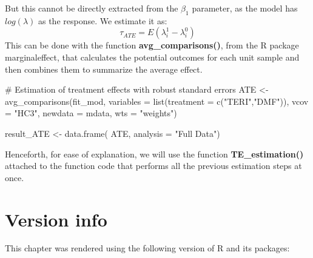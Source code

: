 \documentclass[
  letterpaper,
  DIV=11,
  numbers=noendperiod]{scrreprt}
\newenvironment{Shaded}{\begin{snugshade}}{\end{snugshade}}
\newcommand{\AttributeTok}[1]{\textcolor[rgb]{0.40,0.45,0.13}{#1}}
\newcommand{\CommentTok}[1]{\textcolor[rgb]{0.37,0.37,0.37}{#1}}
\newcommand{\FunctionTok}[1]{\textcolor[rgb]{0.28,0.35,0.67}{#1}}
\newcommand{\NormalTok}[1]{\textcolor[rgb]{0.00,0.23,0.31}{#1}}
\newcommand{\OtherTok}[1]{\textcolor[rgb]{0.00,0.23,0.31}{#1}}
\newcommand{\StringTok}[1]{\textcolor[rgb]{0.13,0.47,0.30}{#1}}
\begin{document}
But this cannot be directly extracted from the \(\beta_1\) parameter, as
the model has \(log(\lambda)\) as the response. We estimate it as:
\[\tau_{ATE}=E(\lambda^1_i-\lambda^0_i)\] This can be done with the
function \textbf{avg\_comparisons()}, from the R package marginaleffect,
that calculates the potential outcomes for each unit sample and then
combines them to summarize the average effect.

\begin{Shaded}
\begin{Highlighting}[]
\CommentTok{\# Estimation of treatment effects with robust standard errors}
\NormalTok{ATE }\OtherTok{\textless{}{-}} \FunctionTok{avg\_comparisons}\NormalTok{(fit\_mod, }
                       \AttributeTok{variables =} \FunctionTok{list}\NormalTok{(}\AttributeTok{treatment =} \FunctionTok{c}\NormalTok{(}\StringTok{"TERI"}\NormalTok{,}\StringTok{"DMF"}\NormalTok{)),}
                       \AttributeTok{vcov =} \StringTok{"HC3"}\NormalTok{,}
                       \AttributeTok{newdata =}\NormalTok{ mdata,}
                       \AttributeTok{wts =} \StringTok{"weights"}\NormalTok{)}

\NormalTok{result\_ATE }\OtherTok{\textless{}{-}} \FunctionTok{data.frame}\NormalTok{( ATE,}
                          \AttributeTok{analysis =} \StringTok{"Full Data"}\NormalTok{)}
\end{Highlighting}
\end{Shaded}

Henceforth, for ease of explanation, we will use the function
\textbf{TE\_estimation()} attached to the function code that performs
all the previous estimation steps at once.

\hypertarget{version-info-3}{%
\section*{Version info}\label{version-info-3}}


This chapter was rendered using the following version of R and its
packages:
\end{document}
